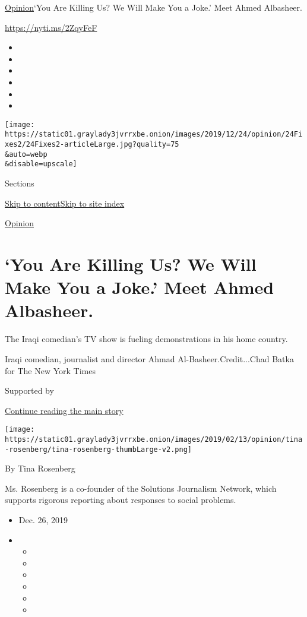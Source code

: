 \href{/section/opinion}{Opinion}\textbar{}`You Are Killing Us? We Will
Make You a Joke.' Meet Ahmed Albasheer.

\url{https://nyti.ms/2ZqyFeF}

\begin{itemize}
\item
\item
\item
\item
\item
\item
\end{itemize}

\texttt{[image: https://static01.graylady3jvrrxbe.onion/images/2019/12/24/opinion/24Fixes2/24Fixes2-articleLarge.jpg?quality=75\\\&auto=webp\\\&disable=upscale]}

Sections

\protect\hyperlink{site-content}{Skip to
content}\protect\hyperlink{site-index}{Skip to site index}

\href{/section/opinion}{Opinion}

\hypertarget{you-are-killing-us-we-will-make-you-a-joke-meet-ahmed-albasheer}{%
\section{`You Are Killing Us? We Will Make You a Joke.' Meet Ahmed
Albasheer.}\label{you-are-killing-us-we-will-make-you-a-joke-meet-ahmed-albasheer}}

The Iraqi comedian's TV show is fueling demonstrations in his home
country.

Iraqi comedian, journalist and director Ahmad Al-Basheer.Credit...Chad
Batka for The New York Times

Supported by

\protect\hyperlink{after-sponsor}{Continue reading the main story}

\texttt{[image: https://static01.graylady3jvrrxbe.onion/images/2019/02/13/opinion/tina-rosenberg/tina-rosenberg-thumbLarge-v2.png]}

By Tina Rosenberg

Ms. Rosenberg is a co-founder of the Solutions Journalism Network, which
supports rigorous reporting about responses to social problems.

\begin{itemize}
\item
  Dec. 26, 2019
\item
  \begin{itemize}
  \item
  \item
  \item
  \item
  \item
  \item
  \end{itemize}
\end{itemize}


